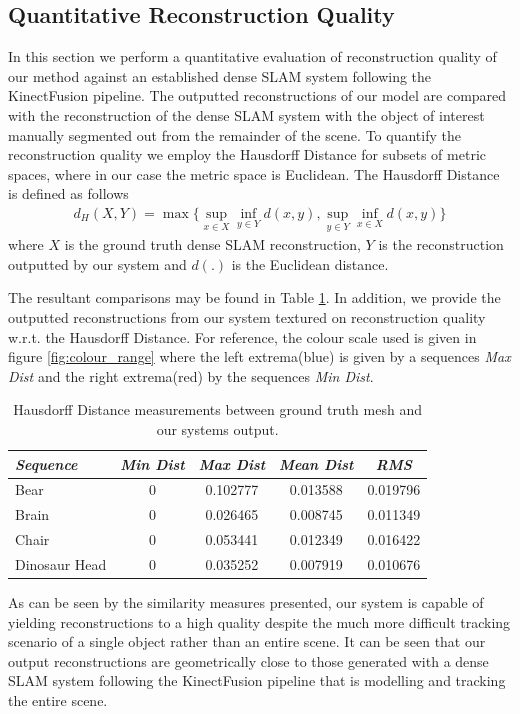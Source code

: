 \subsection{Quantitative Reconstruction Quality}
In this section we perform a quantitative evaluation of reconstruction quality of our method against an established dense SLAM system \cite{Prisacariu2014} following the KinectFusion \cite{Newcombe2011} pipeline.
The outputted reconstructions of our model are compared with the reconstruction of the dense SLAM system with the object of interest manually segmented out from the remainder of the scene. To quantify the reconstruction quality 
we employ the Hausdorff Distance \cite{Hausdorff} for subsets of metric spaces, where in our case the metric space is Euclidean. The Hausdorff Distance is defined as follows
\begin{equation}
\begin{split}
d_{H}(X, Y) = \max \Bigg \{ \sup_{x \in X} \inf_{y \in Y} d(x, y), \sup_{y \in Y} \inf_{x \in X} d(x, y) \Bigg \}
\end{split}
\end{equation}
where $X$ is the ground truth dense SLAM reconstruction, $Y$ is the reconstruction outputted by our system and $d(.)$ is the Euclidean distance.

The resultant comparisons may be found in Table \ref{hausdorffTable}. In addition, we provide the outputted reconstructions from our system textured on reconstruction quality w.r.t. the Hausdorff Distance. 
For reference, the colour scale used is given in figure \ref{fig:colour_range} where the left extrema(blue) is given by a sequences \textit{Max Dist} and the right extrema(red) by the sequences \textit{Min Dist}. 
\begin{table}[!t]
	{
		\footnotesize
		\begin{center}
			\begin{tabular}{l c c c c}
				\emph{Sequence} & \emph{Min Dist} & \emph{Max Dist} & \emph{Mean Dist} & \emph{RMS}\\
				\midrule
				\textsf{Bear} & 0 & 0.102777 & 0.013588 & 0.019796 \\
				\textsf{Brain} & 0 & 0.026465 & 0.008745 & 0.011349 \\
				\textsf{Chair} & 0 & 0.053441 & 0.012349 & 0.016422 \\
				\textsf{Dinosaur Head} & 0 & 0.035252 & 0.007919 & 0.010676
			\end{tabular}
		\end{center}
	}
\vspace{-3mm}
	\caption{Hausdorff Distance measurements between ground truth mesh and our systems output.}
	\label{hausdorffTable}
\end{table}
As can be seen by the similarity measures presented, our system is capable of yielding reconstructions to a high quality despite the much more difficult tracking scenario of a single object rather than an entire 
scene. It can be seen that our output reconstructions are geometrically close to those generated with a dense SLAM system \cite{Prisacariu2014} following the KinectFusion \cite{Newcombe2011} pipeline that 
is modelling and tracking the entire scene.

